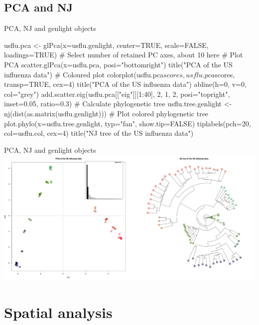 \documentclass[compress, ucs, xelatex, 11pt, xcolor=svgnames,
  hyperref={
    bookmarks=true,
    unicode=true,
    colorlinks=true,
    pdftitle={Molecular data in R},
    plainpages=false,
    pdfauthor={Vojtech Zeisek},
    pdfsubject={Course about phylogeny and evolution in R},
    pdfcreator={XeLaTeX},
    pdfkeywords={R, evolution, phylogeny, molecular data},
    linkcolor=Tomato,
    anchorcolor=SaddleBrown,
    citecolor=Goldenrod,
    filecolor=DarkMagenta,
    menucolor=Sienna,
    urlcolor=DarkTurquoise,
    pdftex},
  url={hyphens, lowtilde} %
  ]{beamer}
\begin{document}
\subsection{PCA and NJ}

\begin{frame}[fragile]{PCA, NJ and genlight objects}
  \begin{spluscode}
    usflu.pca <- glPca(x=usflu.genlight, center=TRUE, scale=FALSE,
      loadings=TRUE) # Select number of retained PC axes, about 10 here
    # Plot PCA
    scatter.glPca(x=usflu.pca, posi="bottomright")
    title("PCA of the US influenza data")
    # Coloured plot
    colorplot(usflu.pca$scores, usflu.pca$scores, transp=TRUE, cex=4)
    title("PCA of the US influenza data")
    abline(h=0, v=0, col="grey")
    add.scatter.eig(usflu.pca[["eig"]][1:40], 2, 1, 2, posi="topright",
      inset=0.05, ratio=0.3)
    # Calculate phylogenetic tree
    usflu.tree.genlight <- nj(dist(as.matrix(usflu.genlight)))
    # Plot colored phylogenetic tree
    plot.phylo(x=usflu.tree.genlight, typ="fan", show.tip=FALSE)
    tiplabels(pch=20, col=usflu.col, cex=4)
    title("NJ tree of the US influenza data")
  \end{spluscode}
\end{frame}

\begin{frame}{PCA, NJ and genlight objects}
\includegraphics[width=\textwidth]{flu_pcoa_nj.png}
\end{frame}

\section{Spatial analysis}
\end{document}
